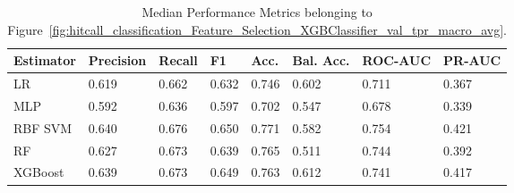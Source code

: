 \begin{longtable}{llllllll}
\caption{Median Performance Metrics belonging to Figure~\ref{fig:hitcall_classification_Feature_Selection_XGBClassifier_val_tpr_macro_avg}.}\label{tab:table:hitcall_classification_feature_selection_xgbclassifier_val_tpr_macro_avg}\\
\toprule
\midrule
\small Estimator & \small Precision & \small Recall & \small F1 & \small Acc. & \small Bal. Acc. & \small ROC-AUC & \small PR-AUC\\
\hline
LR & 0.619 & 0.662 & 0.632 & 0.746 & 0.602 & 0.711 & 0.367\\
MLP & 0.592 & 0.636 & 0.597 & 0.702 & 0.547 & 0.678 & 0.339\\
RBF SVM & 0.640 & 0.676 & 0.650 & 0.771 & 0.582 & 0.754 & 0.421\\
RF & 0.627 & 0.673 & 0.639 & 0.765 & 0.511 & 0.744 & 0.392\\
XGBoost & 0.639 & 0.673 & 0.649 & 0.763 & 0.612 & 0.741 & 0.417\\
\bottomrule
\end{longtable}